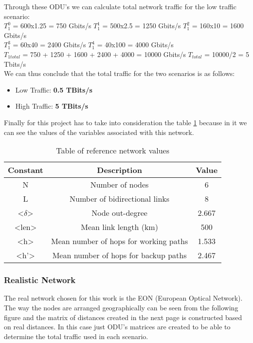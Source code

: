 Through these ODU's we can calculate total network traffic for the low traffic scenario:\\
$T_1^0$ = 600x1.25 = 750 Gbits/s \qquad
$T_1^1$ = 500x2.5 = 1250 Gbits/s \qquad
$T_1^2$ = 160x10 = 1600 Gbits/s \\
$T_1^3$ = 60x40 = 2400 Gbits/s \quad
$T_1^4$ = 40x100 = 4000 Gbits/s \\
$T_{1total}$ = 750 + 1250 + 1600 + 2400 + 4000 = 10000 Gbits/s \qquad
$T_{total}$ = 10000/2 = 5 Tbits/s\\

We can thus conclude that the total traffic for the two scenarios is as follows:
\begin{itemize}
  \item Low Traffic: \textbf{0.5 TBits/s}
  \item High Traffic: \textbf{5 TBits/s}
\end{itemize}

Finally for this project has to take into consideration the table \ref{table:3} because in it we can see the values of the variables associated with this network.
\begin{table}[h!]
\centering
\begin{tabular}{|| c | c | c||}
 \hline
 Constant & Description & Value \\
 \hline\hline
 N & Number of nodes & 6 \\
 L & Number of bidirectional links & 8 \\
 <$\delta$> & Node out-degree & 2.667 \\
 <len> & Mean link length (km) & 500 \\
 <h> & Mean number of hops for working paths & 1.533 \\
 <h'> & Mean number of hops for backup paths & 2.467 \\
 \hline
\end{tabular}
\caption{Table of reference network values}
\label{table:3}
\end{table}


\subsubsection{Realistic Network}
The real network chosen for this work is the EON (European Optical Network).
The way the nodes are arranged geographically can be seen from the following figure and the matrix of distances created in the next page is constructed based on real distances.
In this case just ODU's matrices are created to be able to determine the total traffic used in each scenario.

